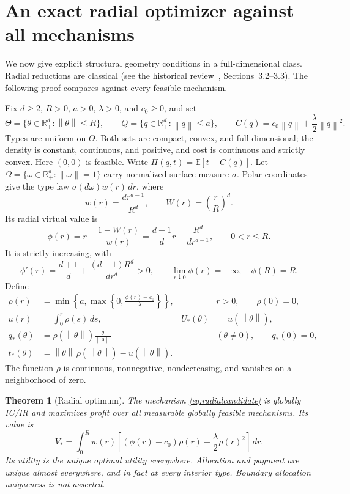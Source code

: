 \documentclass[11pt,a4paper]{article}
\numberwithin{equation}{section}
\newtheorem{theorem}{Theorem}
\newcommand{\R}{\mathbb R}
\newcommand{\E}{\mathbb E}
\newcommand{\norm}[1]{\left\lVert #1\right\rVert}
\begin{document}
\section{An exact radial optimizer against all mechanisms}\label{sec:radial}
We now give explicit structural geometry conditions in a full-dimensional
class. Radial reductions are classical
(see the historical review~\cite{Rochet2024}, Sections~3.2--3.3).
The following proof compares against every feasible mechanism.

Fix \(d\ge2\), \(R>0\), \(a>0\), \(\lambda>0\), and \(c_0\ge0\), and set
\[
 \Theta=\{\theta\in\R_+^d:\norm\theta\le R\},\qquad
 Q=\{q\in\R_+^d:\norm q\le a\},\qquad
 C(q)=c_0\norm q+\frac{\lambda}{2}\norm q^2.
\]
Types are uniform on \(\Theta\). Both sets are compact, convex, and
full-dimensional; the density is constant, continuous, and positive,
and cost is continuous and strictly convex. Here \((0,0)\) is feasible.
Write \(\Pi(q,t)=\E[t-C(q)]\).
Let \(\Omega=\{\omega\in\R_+^d:\norm\omega=1\}\) carry normalized
surface measure \(\sigma\). Polar coordinates give the type law
\(\sigma(d\omega)w(r)\,dr\), where
\[
 w(r)=\frac{dr^{d-1}}{R^d},\qquad W(r)=\left(\frac rR\right)^d.
\]
Its radial virtual value is
\begin{equation}\label{eq:virtual}
 \phi(r)=r-\frac{1-W(r)}{w(r)}
 =\frac{d+1}{d}r-\frac{R^d}{dr^{d-1}},\qquad 0<r\le R.
\end{equation}
It is strictly increasing, with
\[
 \phi'(r)=\frac{d+1}{d}+\frac{(d-1)R^d}{dr^d}>0,\qquad
 \lim_{r\downarrow0}\phi(r)=-\infty,\quad \phi(R)=R.
\]
Define
\begin{equation}\label{eq:radialcandidate}
 \begin{aligned}
 \rho(r)&=\min\left\{a,\max\left\{0,\frac{\phi(r)-c_0}{\lambda}\right\}\right\},
          &&r>0,\qquad \rho(0)=0,\\
 u(r)&=\int_0^r\rho(s)\,ds,& U_*(\theta)&=u(\norm\theta),\\
 q_*(\theta)&=\rho(\norm\theta)\frac{\theta}{\norm\theta}
          &&(\theta\ne0),\qquad q_*(0)=0,\\
 t_*(\theta)&=\norm\theta\,\rho(\norm\theta)-u(\norm\theta).
 \end{aligned}
\end{equation}
The function \(\rho\) is continuous, nonnegative, nondecreasing, and
vanishes on a neighborhood of zero.

\begin{theorem}[Radial optimum]\label{thm:radial}
The mechanism \eqref{eq:radialcandidate} is globally IC/IR and maximizes
profit over all measurable globally feasible mechanisms.
Its value is
\begin{equation}\label{eq:radialvalue}
 V_*=\int_0^Rw(r)\left[(\phi(r)-c_0)\rho(r)
                         -\frac{\lambda}{2}\rho(r)^2\right]\,dr.
\end{equation}
Its utility is the unique optimal utility everywhere. Allocation and
payment are unique almost everywhere, and in fact at every interior type.
Boundary allocation uniqueness is not asserted.
\end{theorem}
\end{document}
